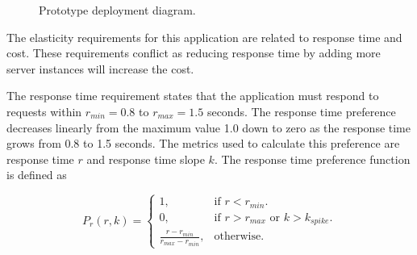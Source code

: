 \documentclass[english]{tktltiki2}
\theoremstyle{definition}
\theoremstyle{remark}
\begin{document}
\begin{figure}[h]
	\centerline{
	}
	\caption{Prototype deployment diagram.}
	\label{fig:deploymentDiagram}
\end{figure}

The elasticity requirements for this application are related to response time
and cost. These requirements conflict as reducing response time by adding more
server instances will increase the cost.

The response time requirement states that the application must respond to
requests within $r_{min} = 0.8$ to $r_{max} = 1.5$
seconds. The response time preference decreases linearly from the maximum value
1.0 down to zero as the response time grows from 0.8 to 1.5 seconds. The metrics used to calculate this preference are response time $r$ and response
time slope $k$. The response time preference function is defined as  

\begin{equation}
P_{r}(r, k) = \begin{cases}
    1, & \text{if $r < r_{min}$}.\\
    0, & \text{if $r > r_{max}$ or $k > k_{spike}$}.\\
    \frac{r - r_{min}}
    	 {r_{max} - r_{min}}, & \text{otherwise}.
  \end{cases}
  \label{eq:responseTimePreference}
\end{equation}
\end{document}
